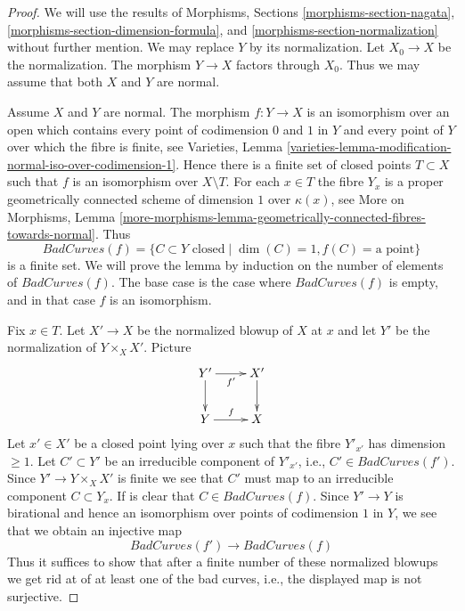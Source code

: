 \documentclass{stacks-project}
\theoremstyle{plain}
\theoremstyle{definition}
\theoremstyle{remark}
\numberwithin{equation}{subsection}
\begin{document}
\begin{proof}
We will use the results of Morphisms, Sections
\ref{morphisms-section-nagata},
\ref{morphisms-section-dimension-formula}, and
\ref{morphisms-section-normalization} without further mention.
We may replace $Y$ by its normalization. Let $X_0 \to X$
be the normalization. The morphism $Y \to X$ factors through $X_0$.
Thus we may assume that both $X$ and $Y$ are normal.

\medskip\noindent
Assume $X$ and $Y$ are normal. The morphism $f : Y \to X$ is an isomorphism
over an open which contains every point of codimension $0$ and $1$ in $Y$ and
every point of $Y$ over which the fibre is finite, see Varieties, Lemma
\ref{varieties-lemma-modification-normal-iso-over-codimension-1}.
Hence there is a finite set of closed points $T \subset X$
such that $f$ is an isomorphism over $X \setminus T$. For each $x \in T$
the fibre $Y_x$ is a proper geometrically connected scheme of dimension $1$
over $\kappa(x)$, see
More on Morphisms, Lemma
\ref{more-morphisms-lemma-geometrically-connected-fibres-towards-normal}.
Thus
$$
BadCurves(f) = \{C \subset Y\text{ closed} \mid
\dim(C) = 1, f(C) = \text{a point}\}
$$
is a finite set. We will prove the lemma by induction on the number
of elements of $BadCurves(f)$. The base case is the case where $BadCurves(f)$
is empty, and in that case $f$ is an isomorphism.

\medskip\noindent
Fix $x \in T$. Let $X' \to X$ be the normalized blowup of $X$ at $x$ and let
$Y'$ be the normalization of $Y \times_X X'$. Picture
$$
\xymatrix{
Y' \ar[r]_{f'} \ar[d] & X' \ar[d] \\
Y \ar[r]^f & X
}
$$
Let $x' \in X'$ be a closed point lying over $x$ such that
the fibre $Y'_{x'}$ has dimension $\geq 1$. Let $C' \subset Y'$
be an irreducible component of $Y'_{x'}$, i.e., $C' \in BadCurves(f')$.
Since $Y' \to Y \times_X X'$ is finite we see that $C'$ must map
to an irreducible component $C \subset Y_x$.
If is clear that $C \in BadCurves(f)$.
Since $Y' \to Y$ is birational and hence an isomorphism over points of
codimension $1$ in $Y$, we see that we obtain an injective map
$$
BadCurves(f') \longrightarrow BadCurves(f)
$$
Thus it suffices to show that after a finite number of these
normalized blowups we get rid at of at least one of the bad
curves, i.e., the displayed map is not surjective.


\end{proof}
\end{document}
